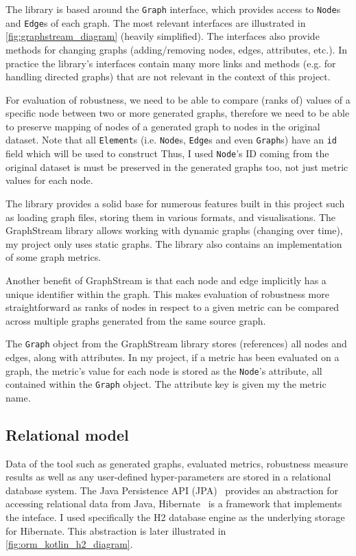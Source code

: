 The library is based around the \texttt{Graph} interface, which provides access to \texttt{Node}s and \texttt{Edge}s of each graph.
The most relevant interfaces are illustrated in \autoref{fig:graphstream_diagram} (heavily simplified).
The interfaces also provide methods for changing graphs (adding/removing nodes, edges, attributes, etc.).
In practice the library's interfaces contain many more links and methods (e.g. for handling directed graphs) that are not relevant in the context of this project.

For evaluation of robustness, we need to be able to compare (ranks of) values of a specific node between two or more generated graphs, therefore we need to be able to preserve mapping of nodes of a generated graph to nodes in the original dataset.
Note that all \texttt{Element}s (i.e. \texttt{Node}s, \texttt{Edge}s and even \texttt{Graph}s) have an \texttt{id} field which will be used to construct 
Thus, I used \texttt{Node}'s ID coming from the original dataset is must be preserved in the generated graphs too, not just metric values for each node.

The library provides a solid base for numerous features built in this project such as loading graph files, storing them in various formats, and visualisations.
The GraphStream library allows working with dynamic graphs (changing over time), my project only uses static graphs.
The library also contains an implementation of some graph metrics.

Another benefit of GraphStream is that each node and edge implicitly has a unique identifier within the graph.
This makes evaluation of robustness more straightforward as ranks of nodes in respect to a given metric can be compared across multiple graphs generated from the same source graph.

\parspace

The \texttt{Graph} object from the GraphStream library stores (references) all nodes and edges, along with attributes.
In my project, if a metric has been evaluated on a graph, the metric's value for each node is stored as the \texttt{Node}'s attribute, all contained within the \texttt{Graph} object.
The attribute key is given my the metric name.


\subsection{Relational model}

Data of the \graffs tool such as generated graphs, evaluated metrics, robustness measure results as well as any user-defined hyper-parameters are stored in a relational database system.
The Java Persistence API (JPA)~\cite{BiswasJavaPersistenceAPI2016} provides an abstraction for accessing relational data from Java, Hibernate~\cite{ElliottHibernateDeveloperNotebook2004,BauerJavaPersistenceHibernate2015} is a framework that implements the inteface.
I used specifically the H2 database engine\cite{MuellerH2DatabaseEngine2006} as the underlying storage for Hibernate.
This abstraction is later illustrated in \autoref{fig:orm_kotlin_h2_diagram}.

